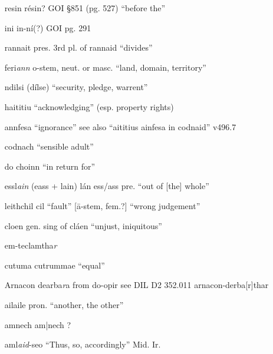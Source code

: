 \documentclass[11pt]{article}
\begin{document}
\begin{enumerate}
  \item[resin] r\'{e}sin? GOI \S 851 (pg. 527) \enquote{before the}

  \item[ini] in-n\'{i}(?) GOI pg. 291

  \item[rannait] pres. 3rd pl. of rannaid \enquote{divides}

  \item[feri\emph{ann}] o-stem, neut. or masc. \enquote{land, domain, territory}

  \item[ndilsi] (d\'{i}lse) \enquote{security, pledge, warrent}

  \item[haititiu] \enquote{acknowledging} (esp. property rights)

  \item[annfesa] \enquote{ignorance} see also \enquote{aititius ainfesa in codnaid} v496.7

  \item[codnach] \enquote{sensible adult}

  \item[do choinn] \enquote{in return for}

  \item[essl\emph{ain}] (eass + lain) l\'{a}n ess/ass pre. \enquote{out of [the] whole}

  \item[leithchil] cil \enquote{fault} [\={a}-stem, fem.?] \enquote{wrong judgement}
  
  \item[cloen] gen. sing of cl\'{a}en \enquote{unjust, iniquitous}

  \item[em-teclamtha\emph{r}] 

  \item[cutuma] cutrummae \enquote{equal}

  \item[Arnacon dearba\emph{r}a] from do-opir see DIL D2 352.011 arnacon-derba[r]thar

  \item[ailaile] pron. \enquote{another, the other}

  \item[amnech] am|nech ?

  \item[aml\emph{aid}-seo] \enquote{Thus, so, accordingly} Mid. Ir.


\end{enumerate}
\end{document}
